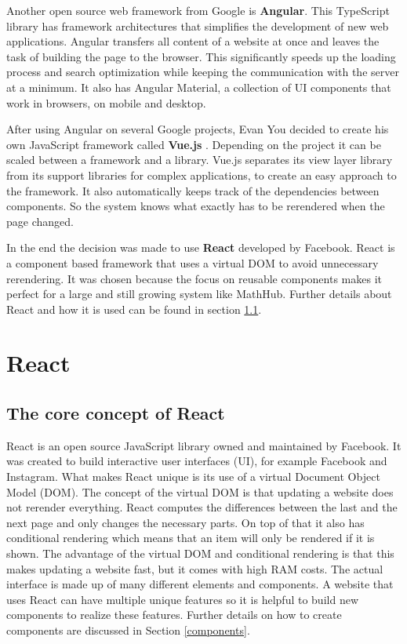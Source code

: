 \documentclass[11pt,a4paper]{article}
\begin{document}
Another open source web framework from Google is \textbf{Angular}\cite{angular}.
This TypeScript library has framework architectures that simplifies the development of new web applications.
Angular transfers all content of a website at once and leaves the task of building the page to the browser.
This significantly speeds up the loading process and search optimization while keeping the communication with the server at a minimum. 
It also has Angular Material, a collection of UI components that work in browsers, on mobile and desktop.

After using Angular on several Google projects, Evan You decided to create his own JavaScript framework called \textbf{Vue.js} \cite{vuewiki}.
Depending on the project it can be scaled between a framework and a library.
Vue.js separates its view layer library from its support libraries for complex applications, to create an easy approach to the framework.
It also automatically keeps track of the dependencies between components.
So the system knows what exactly has to be rerendered when the page changed\cite{vuegit}.

In the end the decision was made to use \textbf{React} developed by Facebook.
React is a component based framework that uses a virtual DOM to avoid unnecessary rerendering.
It was chosen because the focus on reusable components makes it perfect for a large and still growing system like MathHub. 
Further details about React and how it is used can be found in section \ref{react}.


\section{React}
\subsection{The core concept of React} \label{react}
React is an open source JavaScript library owned and maintained by Facebook.
It was created to build interactive user interfaces (UI), for example Facebook and Instagram.
What makes React unique is its use of a virtual Document Object Model (DOM).
The concept of the virtual DOM is that updating a website does not rerender everything.
React computes the differences between the last and the next page and only changes the necessary parts.
On top of that it also has conditional rendering which means that an item will only be rendered if it is shown.
The advantage of the virtual DOM and conditional rendering is that this makes updating a website fast, but it comes with high RAM costs.
The actual interface is made up of many different elements and components.
A website that uses React can have multiple unique features so it is helpful to build new components to realize these features\cite{reactjs}.
Further details on how to create components are discussed in Section \ref{components}.
\end{document}
